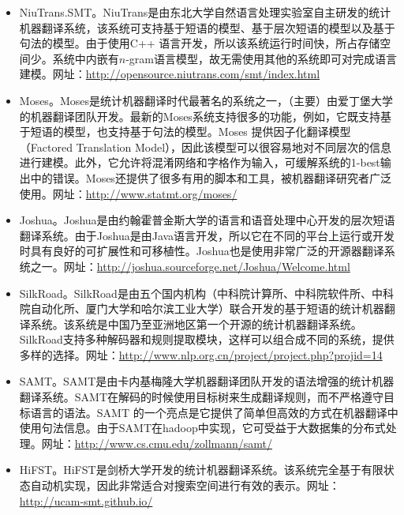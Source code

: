 \begin{itemize}
\vspace{0.5em}
\item NiuTrans.SMT。NiuTrans\cite{Tong2012NiuTrans}是由东北大学自然语言处理实验室自主研发的统计机器翻译系统，该系统可支持基于短语的模型、基于层次短语的模型以及基于句法的模型。由于使用C++ 语言开发，所以该系统运行时间快，所占存储空间少。系统中内嵌有$n$-gram语言模型，故无需使用其他的系统即可对完成语言建模。网址：\url{http://opensource.niutrans.com/smt/index.html}
\vspace{0.5em}
\item Moses。Moses\cite{Koehn2007Moses}是统计机器翻译时代最著名的系统之一，（主要）由爱丁堡大学的机器翻译团队开发。最新的Moses系统支持很多的功能，例如，它既支持基于短语的模型，也支持基于句法的模型。Moses 提供因子化翻译模型（Factored Translation Model），因此该模型可以很容易地对不同层次的信息进行建模。此外，它允许将混淆网络和字格作为输入，可缓解系统的1-best输出中的错误。Moses还提供了很多有用的脚本和工具，被机器翻译研究者广泛使用。网址：\url{http://www.statmt.org/moses/}
\vspace{0.5em}
\item Joshua。Joshua\cite{Li2010Joshua}是由约翰霍普金斯大学的语言和语音处理中心开发的层次短语翻译系统。由于Joshua是由Java语言开发，所以它在不同的平台上运行或开发时具有良好的可扩展性和可移植性。Joshua也是使用非常广泛的开源器翻译系统之一。网址：\url{http://joshua.sourceforge.net/Joshua/Welcome.html}
\vspace{0.5em}
\item SilkRoad。SilkRoad是由五个国内机构（中科院计算所、中科院软件所、中科院自动化所、厦门大学和哈尔滨工业大学）联合开发的基于短语的统计机器翻译系统。该系统是中国乃至亚洲地区第一个开源的统计机器翻译系统。SilkRoad支持多种解码器和规则提取模块，这样可以组合成不同的系统，提供多样的选择。网址：\url{http://www.nlp.org.cn/project/project.php?projid=14}
\vspace{0.5em}
\item SAMT。SAMT\cite{zollmann2007the}是由卡内基梅隆大学机器翻译团队开发的语法增强的统计机器翻译系统。SAMT在解码的时候使用目标树来生成翻译规则，而不严格遵守目标语言的语法。SAMT 的一个亮点是它提供了简单但高效的方式在机器翻译中使用句法信息。由于SAMT在hadoop中实现，它可受益于大数据集的分布式处理。网址：\url{http://www.cs.cmu.edu/zollmann/samt/}
\vspace{0.5em}
\item HiFST。HiFST\cite{iglesias2009hierarchical}是剑桥大学开发的统计机器翻译系统。该系统完全基于有限状态自动机实现，因此非常适合对搜索空间进行有效的表示。网址：\url{http://ucam-smt.github.io/}

\end{itemize}
